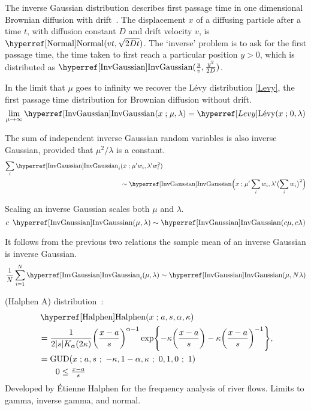 The inverse Gaussian distribution describes first passage time in one dimensional Brownian diffusion with drift~\cite{Chhikara1989}. The displacement $x$ of a diffusing particle after a time $t$, with diffusion constant $D$ and drift velocity $v$,  is $\opr{Normal}(vt, \sqrt{2 D t})$. The `inverse' problem is to ask for the first passage time, the time taken to first reach a particular position $y>0$, which is distributed as $\opr{InvGaussian}(\tfrac{y}{v},\tfrac{y^2}{2D})$. 

In the limit that $\mu$ goes to infinity we recover the L\'evy distribution \eqref{Levy}, the first passage time distribution for Brownian diffusion without drift.
\[
\lim_{\mu\rightarrow\infty} \opr{InvGaussian}(x\given \mu, \lambda) = \Levy(x\given 0,\lambda) \checked
\notag
\]

The sum of independent inverse Gaussian random variables is also inverse Gaussian, provided that $\mu^2/\lambda$ is a constant.
\begin{align*}
\sum_i \opr{InvGaussian}_i &(x\given \mu' w_i, \lambda' w_i^2) 
\\
& \sim \opr{InvGaussian}\Bigl(x\given \mu' \sum_i w_i, \lambda' \bigl(\sum_i w_i\bigr)^2 \Bigr) \checked
\end{align*}

Scaling an inverse Gaussian scales both $\mu$ and $\lambda$. 
\[
c\ \opr{InvGaussian} (\mu, \lambda) \sim \opr{InvGaussian} (c \mu, c \lambda) \checked
\notag
\]

It follows from the previous two relations the sample mean of an inverse Gaussian is inverse Gaussian.
\[
\frac{1}{N} \sum_{i=1}^N \opr{InvGaussian}_i (\mu, \lambda) \sim \opr{InvGaussian} (\mu, N \lambda) \checked
\notag 
\]


\newcommand{\sep}{\ ; \ } %



 (Halphen A) distribution~\cite{Halphen1941}:
\begin{align}
\label{Halphen}
&\opr{Halphen}(x\given a,s, \alpha, \kappa) 
\\
&= \frac{1}{2 |s| K_{\alpha} (2\kappa)} \Left(\frac{x-a}{s}\Right)^{\alpha-1} 
\exp\Left\{-\kappa \Left(\frac{x-a}{s}\Right) -\kappa \Left(\frac{x-a}{s}\Right)^{-1}\Right\},
\checked
\notag
\\
 &=  \op{GUD}(x\given a,s \sep -\kappa, 1-\alpha, \kappa\sep 0,1,0 \sep 1)
\notag
\checked
\\& \qquad  0 \leq \tfrac{x-a}{s}
\notag
\end{align}
Developed by \'Etienne Halphen for the frequency analysis of river flows.
Limits to gamma, inverse gamma, and normal.



